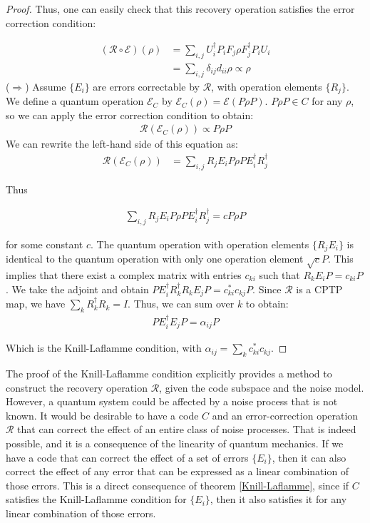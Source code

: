\documentclass[12pt, twoside, openany]{book}
\begin{document}
\begin{proof}
Thus, one can easily check that this recovery operation satisfies the error correction condition:

\begin{align*}
    (\mathcal{R} \circ \mathcal{E})(\rho) &= \sum_{i,j} U_i^\dagger P_i F_j \rho F_j^\dagger P_i U_i \\
    &= \sum_{i,j} \delta_{ij} d_{ii} \rho \propto \rho
\end{align*}
($\Rightarrow$) Assume $\{ E_i \}$ are errors correctable by $\mathcal{R}$, with operation elements $\{ R_j \}$. We define a quantum operation $\mathcal{E}_C$ by $\mathcal{E}_C(\rho) =  \mathcal{E}(P \rho P) $. $P \rho P \in C$ for any $\rho$, so we can apply the error correction condition to obtain:
\begin{align*}
    \mathcal{R} ( \mathcal{E}_C(\rho) ) \propto P \rho P
\end{align*}
We can rewrite the left-hand side of this equation as:
\begin{align*}
    \mathcal{R} ( \mathcal{E}_C(\rho) ) &= \sum_{i,j} R_j E_i P \rho P E_i^\dagger R_j^\dagger
\end{align*}

Thus

\begin{align*}
    \sum_{i,j} R_j E_i P \rho P E_i^\dagger R_j^\dagger = c P \rho P
\end{align*}

for some constant $c$. The quantum operation with operation elements $\{ R_j E_i \} $ is identical to the quantum operation with only one operation element $\sqrt{c} P$. This implies that there exist a complex matrix with entries $c_{ki}$ such that $R_k E_i P = c_{ki} P$. We take the adjoint and obtain $P E_i^\dagger R_k^\dagger R_k E_j P= c_{ki}^* c_{kj} P$. Since $\mathcal{R}$ is a CPTP map, we have $ \sum _k R_k^\dagger R_k = I$. Thus, we can sum over $k$ to obtain:
\begin{align*}
    P E_i^\dagger E_j P = \alpha_{ij} P
\end{align*}

Which is the Knill-Laflamme condition, with $\alpha_{ij} = \sum_k c_{ki}^* c_{kj}$.
    
\end{proof}

The proof of the Knill-Laflamme condition explicitly provides a method to construct the recovery operation $\mathcal{R}$, given the code subspace and the noise model. However, a quantum system could be affected by a noise process that is not known. It would be desirable to have a code $C$ and an error-correction operation $\mathcal{R}$ that can correct the effect of an entire class of noise processes. That is indeed possible, and it is a consequence of the linearity of quantum mechanics. If we have a code that can correct the effect of a set of errors $\{ E_i \}$, then it can also correct the effect of any error that can be expressed as a linear combination of those errors. This is a direct consequence of theorem \ref{Knill-Laflamme}, since if $C$ satisfies the Knill-Laflamme condition for $\{ E_i \}$, then it also satisfies it for any linear combination of those errors. \\
\end{document}
